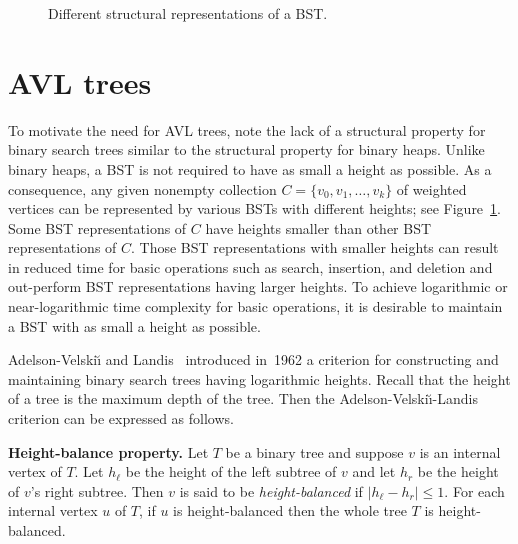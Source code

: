\begin{figure}[!htbp]
{}
\caption{Different structural representations of a BST.}
\label{fig:tree_data_structures:BST_different_structural_representations}
\end{figure}



\section{AVL trees}

To motivate the need for AVL trees, note the lack of a
structural property for binary search trees
similar to the structural
property for binary heaps. Unlike binary heaps, a
BST is not required to have as small a height as possible. As a
consequence, any given nonempty collection
$C = \{v_0, v_1, \dots, v_k\}$ of weighted vertices can be represented
by various BSTs with different heights; see
Figure~\ref{fig:tree_data_structures:BST_different_structural_representations}.
Some BST representations of $C$ have heights smaller than other BST
representations of $C$. Those BST representations with smaller heights
can result in reduced time for basic operations such as search,
insertion, and deletion and out-perform BST representations having
larger heights. To achieve logarithmic or near-logarithmic time
complexity for basic operations, it is desirable to maintain a BST
with as small a height as possible.

Adelson-Velski\u{\i} and
Landis~\cite{AdelsonVelskiiLandis1962}
introduced in~1962 a criterion for constructing and maintaining binary
search trees having logarithmic heights. Recall that the height of a
tree is the maximum depth of the tree. Then the
Adelson-Velski\u{\i}-Landis criterion can be expressed as follows.

\begin{definition}
\textbf{Height-balance property.}
Let $T$ be a binary tree and suppose $v$ is an internal vertex of
$T$. Let $h_\ell$ be the height of the left subtree of $v$ and let
$h_r$ be the height of $v$'s right subtree. Then $v$ is said to be
\emph{height-balanced} if $|h_\ell - h_r| \leq 1$. For each internal
vertex $u$ of $T$, if $u$ is height-balanced then the whole tree $T$
is height-balanced.
\end{definition}


